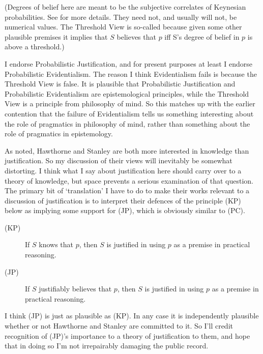 \noindent (Degrees of belief here are meant to be the subjective correlates of Keynesian probabilities. See \citet{Keynes1921} for more details. They need not, and usually will not, be numerical values. The Threshold View is so-called because given some other plausible premises it implies that \(S\) believes that \(p\) iff S's degree of belief in \(p\) is above a threshold.)

I endorse Probabilistic Justification, and for present purposes at least I endorse Probabilistic Evidentialism. The reason I think Evidentialism fails is because the Threshold View is false. It is plausible that Probabilistic Justification and Probabilistic Evidentialism are epistemological principles, while the Threshold View is a principle from philosophy of mind. So this matches up with the earlier contention that the failure of Evidentialism tells us something interesting about the role of pragmatics in philosophy of mind, rather than something about the role of pragmatics in epistemology.

As noted, Hawthorne and Stanley are both more interested in knowledge than justification. So my discussion of their views will inevitably be somewhat distorting. I think what I say about justification here should carry over to a theory of knowledge, but space prevents a serious examination of that question. The primary bit of `translation' I have to do to make their works relevant to a discussion of justification is to interpret their defences of the principle (KP) below as implying some support for (JP), which is obviously similar to (PC).

\begin{description}
\item[(KP)] If \(S\)  knows that \(p\), then \(S\)  is justified in using \(p\) as a premise in practical reasoning.
\item[(JP)] If \(S\)  justifiably believes that \(p\), then \(S\)  is justified in using \(p\) as a premise in practical reasoning.
\end{description}

\noindent I think (JP) is just as plausible as (KP). In any case it is independently plausible whether or not Hawthorne and Stanley are committed to it. So I'll credit recognition of (JP)'s importance to a theory of justification to them, and hope that in doing so I'm not irrepairably damaging the public record.

